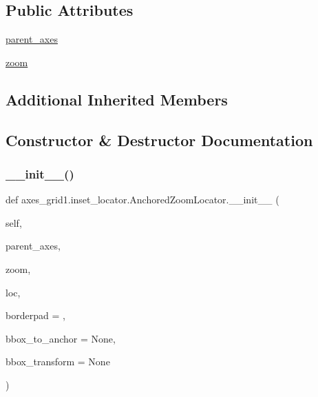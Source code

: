 \subsection*{Public Attributes}
\begin{DoxyCompactItemize}
\item 
\hyperlink{classaxes__grid1_1_1inset__locator_1_1AnchoredZoomLocator_a72a7f6c7b2569806ed73888940e407aa}{parent\+\_\+axes}
\item 
\hyperlink{classaxes__grid1_1_1inset__locator_1_1AnchoredZoomLocator_afcf96036d6ae8321177a4f4bac617812}{zoom}
\end{DoxyCompactItemize}
\subsection*{Additional Inherited Members}


\subsection{Constructor \& Destructor Documentation}
\mbox{\label{classaxes__grid1_1_1inset__locator_1_1AnchoredZoomLocator_a6e0c76c193e3d40c8002ec5ad3e101ac}} 
\subsubsection{\texorpdfstring{\+\_\+\+\_\+init\+\_\+\+\_\+()}{\_\_init\_\_()}}
{\footnotesize\ttfamily def axes\+\_\+grid1.\+inset\+\_\+locator.\+Anchored\+Zoom\+Locator.\+\_\+\+\_\+init\+\_\+\+\_\+ (\begin{DoxyParamCaption}\item[{}]{self,  }\item[{}]{parent\+\_\+axes,  }\item[{}]{zoom,  }\item[{}]{loc,  }\item[{}]{borderpad = {},  }\item[{}]{bbox\+\_\+to\+\_\+anchor = {\ttfamily None},  }\item[{}]{bbox\+\_\+transform = {\ttfamily None} }\end{DoxyParamCaption})}



